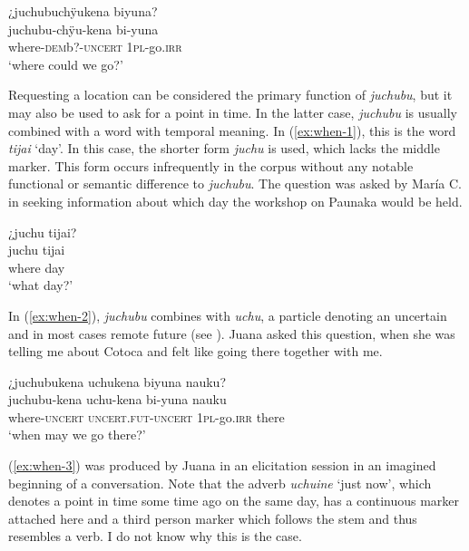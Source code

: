 \ea\label{ex:where-9}
\begingl
\glpreamble ¿juchubuchÿukena biyuna?\\
\gla juchubu-chÿu-kena bi-yuna\\
\glb where-\textsc{dem}b?-\textsc{uncert} 1\textsc{pl}-go.\textsc{irr}\\
\glft ‘where could we go?’
\endgl
\trailingcitation{[nxx-p630101g-1.176]}
\xe

Requesting a location can be considered the primary function of \textit{juchubu}, but it may also be used to ask for a point in time. In the latter case, \textit{juchubu} is usually combined with a word with temporal meaning. In (\ref{ex:when-1}), this is the word \textit{tijai} ‘day’. In this case, the shorter form \textit{juchu} is used, which lacks the middle marker. This form occurs infrequently in the corpus without any notable functional or semantic difference to \textit{juchubu}. The question was asked by María C. in seeking information about which day the workshop on Paunaka would be held.

\ea\label{ex:when-1}
\begingl
\glpreamble ¿juchu tijai?\\
\gla juchu tijai\\
\glb where day\\
\glft ‘what day?’
\endgl
\trailingcitation{[mux-c110810l.015]}
\xe


In (\ref{ex:when-2}), \textit{juchubu} combines with \textit{uchu}, a particle denoting an uncertain and in most cases remote future (see ). Juana asked this question, when she was telling me about Cotoca and felt like going there together with me.

\ea\label{ex:when-2}
\begingl
\glpreamble ¿juchubukena uchukena biyuna nauku?\\
\gla juchubu-kena uchu-kena bi-yuna nauku\\
\glb where-\textsc{uncert} \textsc{uncert.fut}-\textsc{uncert} 1\textsc{pl}-go.\textsc{irr} there\\
\glft ‘when may we go there?’
\endgl
\trailingcitation{[jxx-p120430l-2.557]}
\xe

(\ref{ex:when-3}) was produced by Juana in an elicitation session in an imagined beginning of a conversation. Note that the adverb \textit{uchuine} ‘just now', which denotes a point in time some time ago on the same day, has a continuous marker attached here and a third person marker which follows the stem and thus resembles a verb. I do not know why this is the case.

